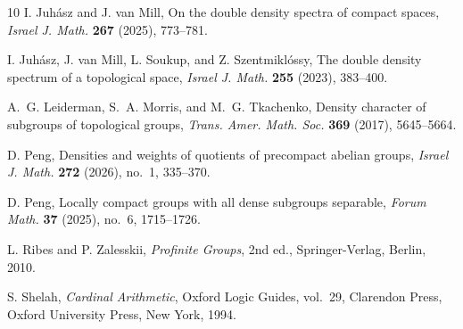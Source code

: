 \documentclass[12pt]{amsart}
\theoremstyle{definition}
\numberwithin{equation}{section}
\theoremstyle{remark}
\begin{document}
\begin{thebibliography}{10}
 I. Juh\'{a}sz and J. van Mill,
On the double density spectra of compact spaces,
\emph{Israel J. Math.} \textbf{267} (2025), 773--781.

 I. Juh\'{a}sz, J. van Mill, L. Soukup, and Z. Szentmikl\'{o}ssy,
The double density spectrum of a topological space,
\emph{Israel J. Math.} \textbf{255} (2023), 383--400.

 A.~G. Leiderman, S.~A. Morris, and M.~G. Tkachenko, 
Density character of subgroups of topological groups, 
\emph{Trans. Amer. Math. Soc.} \textbf{369} (2017), 5645--5664. 

 D. Peng,
Densities and weights of quotients of precompact abelian groups,
\emph{Israel J. Math.} \textbf{272} (2026), no.~1, 335--370.

 D. Peng,
Locally compact groups with all dense subgroups separable,
\emph{Forum Math.} \textbf{37} (2025), no.~6, 1715--1726.

 L. Ribes and P. Zalesskii,
\emph{Profinite Groups},  2nd ed.,
Springer-Verlag, Berlin, 2010.

S. Shelah,
\emph{Cardinal Arithmetic},
Oxford Logic Guides, vol.~29,
Clarendon Press, Oxford University Press, New York, 1994.


\end{thebibliography}
\end{document}

